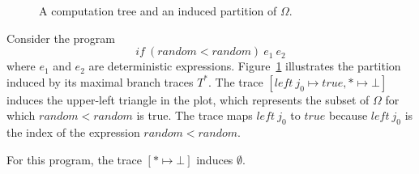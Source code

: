 \begin{figure}[tb!]\centering
{}%
\tab\tab%
%
\caption[A computation tree and an induced partition of $\Omega$]{A computation tree and an induced partition of $\Omega$.}
\label{fig:trace-induced-partition}
\end{figure}


\begin{example}
Consider the program
\begin{equation}
	if~(random < random)~\mathit{e_1}~\mathit{e_2}
\end{equation}
where $\mathit{e_1}$ and $\mathit{e_2}$ are deterministic expressions.
Figure~\ref{fig:trace-induced-partition} illustrates the partition induced by its maximal branch traces $T^*$.
The trace $[left~j_0 \mapsto true, * \mapsto \bot]$ induces the upper-left triangle in the plot, which represents the subset of $\Omega$ for which $random < random$ is true.
The trace maps $left~j_0$ to $true$ because $left~j_0$ is the index of the expression $random < random$.

For this program, the trace $[* \mapsto \bot]$ induces $\emptyset$.
\exampleqed
\end{example}

